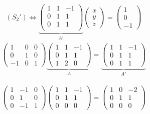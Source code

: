 \begin{exm}
	\begin{align*}
		(S_2') \iff \underbrace{
			\begin{pmatrix}
				1&1&-1\\
				0&1&1\\
				0&1&1\\
			\end{pmatrix} 
		}_{A'}
		\begin{pmatrix}
			x\\y\\z
		\end{pmatrix} =
		\begin{pmatrix}
			1\\0\\-1
		\end{pmatrix} 
	\end{align*}
	\begin{align*}
		\begin{pmatrix}
			1&0&0\\
			0&1&0\\
			-1&0&1
		\end{pmatrix}
		\underbrace{\begin{pmatrix}
			1&1&-1\\
			0&1&1\\
			1&2&0
		\end{pmatrix}}_{A} = 
		\underbrace{\begin{pmatrix}
			1&1&-1\\
			0&1&1\\
			0&1&1
		\end{pmatrix}}_{A'}
	\end{align*}

	\begin{align*}
		\begin{pmatrix}
			1&-1&0\\
			0&1&0\\
			0&-1&1
		\end{pmatrix}
		\begin{pmatrix}
			1&1&-1\\
			0&1&1\\
			0&0&0
		\end{pmatrix}
		=
		\begin{pmatrix}
			1 & 0 & -2\\
			0 & 1 & 1\\
			0 & 0 & 0
		\end{pmatrix} 
	\end{align*}


\end{exm}
